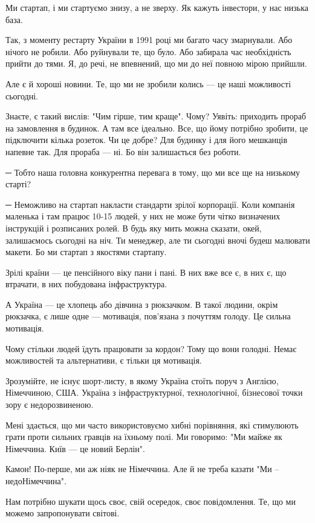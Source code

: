 Ми стартап, і ми стартуємо знизу, а не зверху. Як кажуть інвестори, у нас
низька база.

Так, з моменту рестарту України в 1991 році ми багато часу змарнували. Або
нічого не робили. Або руйнували те, що було. Або забирала час необхідність
прийти до тями. Я, до речі, не впевнений, що ми до неї повною мірою прийшли.

Але є й хороші новини. Те, що ми не зробили колись --- це наші можливості
сьогодні. 

Знаєте, є такий вислів: "Чим гірше, тим краще". Чому? Уявіть: приходить прораб
на замовлення в будинок. А там все ідеально. Все, що йому потрібно зробити, це
підключити кілька розеток. Чи це добре? Для будинку і для його мешканців
напевне так. Для прораба --- ні. Бо він залишається без роботи.

─ Тобто наша головна конкурентна перевага в тому, що ми все ще на низькому
старті?

─ Неможливо на стартап накласти стандарти зрілої корпорації. Коли компанія
маленька і там працює 10-15 людей, у них не може бути чітко визначених
інструкцій і розписаних ролей. В будь яку мить можна сказати, окей, залишаємось
сьогодні на ніч. Ти менеджер, але ти сьогодні вночі будеш малювати макети. Бо
ми стартап з якостями стартапу.

Зрілі країни --- це пенсійного віку пани і пані. В них вже все є, в них є, що
втрачати, в них побудована інфраструктура.

А Україна --- це хлопець або дівчина з рюкзачком. В такої людини, окрім рюкзачка,
є лише одне --- мотивація, пов’язана з почуттям голоду. Це сильна мотивація. 

Чому стільки людей їдуть працювати за кордон? Тому що вони голодні. Немає
можливостей та альтернативи, є тільки ця мотивація.

Зрозумійте, не існує шорт-листу, в якому Україна стоїть поруч з Англією,
Німеччиною, США. Україна з інфраструктурної, технологічної, бізнесової точки
зору є недорозвиненою.

Мені здається, що ми часто використовуємо хибні порівняння, які стимулюють
грати проти сильних гравців на їхньому полі. Ми говоримо: "Ми майже як
Німеччина. Київ --- це новий Берлін".

Камон! По-перше, ми аж ніяк не Німеччина. Але й не треба казати "Ми –
недоНімеччина".

Нам потрібно шукати щось своє, свій осередок, своє повідомлення. Те, що ми
можемо запропонувати світові.

